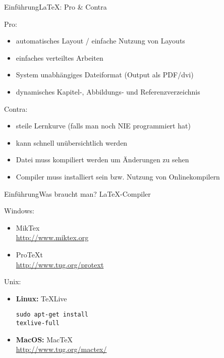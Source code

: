 \begin{frame}{Einf\"uhrung}{\LaTeX: Pro \& Contra}
    \begin{multicols}{2}
        Pro:\\
        \begin{itemize}
            \item automatisches Layout / einfache Nutzung von Layouts
            \item einfaches verteiltes Arbeiten
            \item System unabh\"angiges Dateiformat (Output als PDF/dvi)
            \item dynamisches Kapitel-, Abbildungs- und Referenzverzeichnis
        \end{itemize}\columnbreak\pause
        
        Contra:\\
        \begin{itemize}
            \item steile Lernkurve (falls man noch NIE programmiert hat)
            \item kann schnell un\"ubersichtlich werden
            \item Datei muss kompiliert werden um \"Anderungen zu sehen
            \item Compiler muss installiert sein bzw. Nutzung von Onlinekompilern
        \end{itemize}
    \end{multicols}
\end{frame}
\begin{frame}[fragile]{Einf\"uhrung}{Was braucht man?}
    \Large\LaTeX-Compiler\normalsize\\
    \begin{multicols}{2}
        Windows:\\
        \begin{itemize}
            \item MikTex\\
            \url{http://www.miktex.org}
            \item ProTeXt\\
            \url{http://www.tug.org/protext}
        \end{itemize}
        \columnbreak
        
        Unix:
        \begin{itemize}
            \item \textbf{Linux:} TeXLive\\
                \begin{verbatim}
sudo apt-get install
texlive-full
                \end{verbatim}
            \item \textbf{MacOS:} MacTeX\\
            \url{http://www.tug.org/mactex/}
        \end{itemize}
    \end{multicols}
\end{frame}
